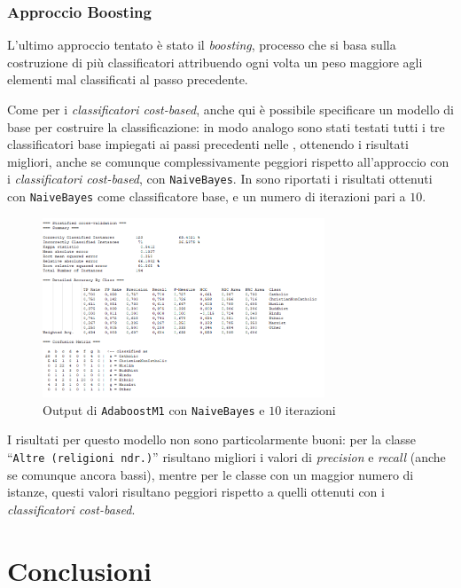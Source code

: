 \documentclass[a4paper,11pt,twoside,notitlepage,final]{scrartcl}
\begin{document}
\subsubsection{Approccio Boosting}

L'ultimo approccio tentato è stato il \emph{boosting}, processo che si basa sulla costruzione di più classificatori attribuendo ogni volta un peso maggiore agli elementi mal classificati al passo precedente.

Come per i \emph{classificatori cost-based}, anche qui è possibile specificare un modello di base per costruire la classificazione:
in modo analogo sono stati testati tutti i tre classificatori base impiegati ai passi precedenti nelle ,
ottenendo i risultati migliori, anche se comunque complessivamente peggiori rispetto all'approccio con i \emph{classificatori cost-based}, con \texttt{NaiveBayes}.
In  sono riportati i risultati ottenuti con \texttt{NaiveBayes} come classificatore base, e un numero di iterazioni pari a \(10\).

\begin{figure}[H]
  \centering
  \includegraphics[width=0.75\textwidth]{fig/AdaboostBayes.PNG}%
  \caption{Output di \texttt{AdaboostM1} con \texttt{NaiveBayes} e \(10\) iterazioni}%
  \label{fig:adaboost:bayes}
\end{figure}

I risultati per questo modello non sono particolarmente buoni: per la classe ``\texttt{Altre (religioni ndr.)}'' risultano migliori i valori di \emph{precision} e \emph{recall} (anche se comunque ancora bassi),
mentre per le classe con un maggior numero di istanze, questi valori risultano peggiori rispetto a quelli ottenuti con i \emph{classificatori cost-based}.

\newpage

\section{Conclusioni}
\end{document}
